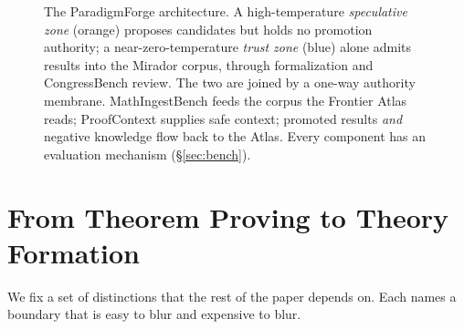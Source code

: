\documentclass[11pt]{article}
\theoremstyle{definition}
\theoremstyle{remark}
\newcommand{\PF}{ParadigmForge}
\begin{document}
\begin{figure}[t]
\centering
\resizebox{\textwidth}{!}{}
\caption{The \PF{} architecture. A high-temperature \emph{speculative zone} (orange) proposes
candidates but holds no promotion authority; a near-zero-temperature \emph{trust zone} (blue) alone
admits results into the Mirador corpus, through formalization and CongressBench review. The two are
joined by a one-way authority membrane. MathIngestBench feeds the corpus the Frontier Atlas reads;
ProofContext supplies safe context; promoted results \emph{and} negative knowledge flow back to the
Atlas. Every component has an evaluation mechanism (\S\ref{sec:bench}).}
\label{fig:arch}
\end{figure}

\section{From Theorem Proving to Theory Formation}
\label{sec:proving-to-forming}

We fix a set of distinctions that the rest of the paper depends on. Each names a boundary that is
easy to blur and expensive to blur.
\end{document}
